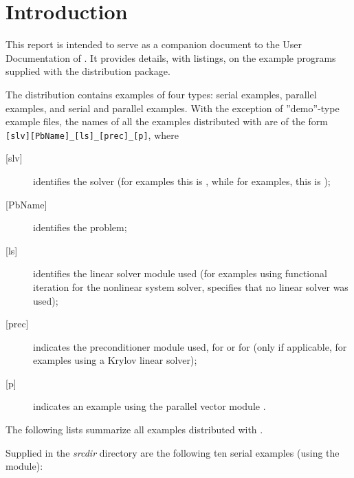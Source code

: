 \section{Introduction}\label{s:ex_intro}

This report is intended to serve as a companion document to the User
Documentation of {\cvode} \cite{cvode_ug}.  It provides details, with
listings, on the example programs supplied with the {\cvode} distribution
package.

The {\cvode} distribution contains examples of four types: serial
{\CC} examples, parallel {\CC} examples, and serial and parallel {\F}
examples.  
With the exception of ''demo''-type example files, the names of all the examples 
distributed with {\sundials} are of the form \verb![slv][PbName]_[ls]_[prec]_[p]!, 
where
\begin{description}
\item [{[slv]}] identifies the solver (for {\cvode} examples this is , 
  while for {\fcvode} examples, this is );
\item [{[PbName]}] identifies the problem;
\item [{[ls]}] identifies the linear solver module used (for examples using
  functional iteration for the nonlinear system solver,  specifies
  that no linear solver was used);
\item [{[prec]}] indicates the {\cvode} preconditioner module used,  for {\cvbandpre}
  or  for {\cvbbdpre} 
  (only if applicable, for examples using a Krylov linear solver);
\item [{[p]}] indicates an example using the parallel vector module {\nvecp}.
\end{description}

\vspace{0.2in}\noindent
The following lists summarize all examples distributed with {\cvode}.

\vspace{0.2in}\noindent
Supplied in the {\em srcdir} directory are the
following ten serial examples (using the {\nvecs} module):

